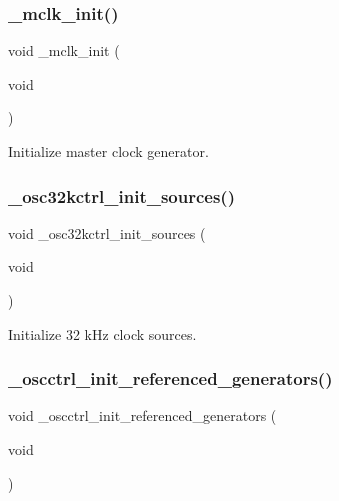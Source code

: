 \subsubsection{\texorpdfstring{\+\_\+mclk\+\_\+init()}{\_mclk\_init()}}
{\footnotesize\ttfamily void \+\_\+mclk\+\_\+init (\begin{DoxyParamCaption}\item[{void}]{ }\end{DoxyParamCaption})}



Initialize master clock generator. 

\mbox{\label{group___h_p_l_gaab304aa890beb23e3311aaa2c0def527}} 
\subsubsection{\texorpdfstring{\+\_\+osc32kctrl\+\_\+init\+\_\+sources()}{\_osc32kctrl\_init\_sources()}}
{\footnotesize\ttfamily void \+\_\+osc32kctrl\+\_\+init\+\_\+sources (\begin{DoxyParamCaption}\item[{void}]{ }\end{DoxyParamCaption})}



Initialize 32 k\+Hz clock sources. 

\mbox{\label{group___h_p_l_ga2e4746bc23999fe1dc7c02aa4e167bfb}} 
\subsubsection{\texorpdfstring{\+\_\+oscctrl\+\_\+init\+\_\+referenced\+\_\+generators()}{\_oscctrl\_init\_referenced\_generators()}}
{\footnotesize\ttfamily void \+\_\+oscctrl\+\_\+init\+\_\+referenced\+\_\+generators (\begin{DoxyParamCaption}\item[{void}]{ }\end{DoxyParamCaption})}



